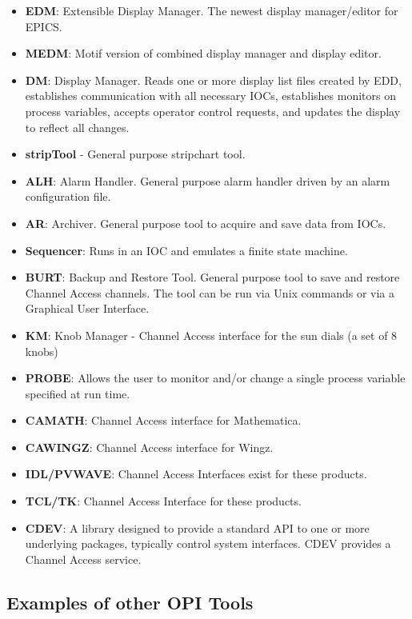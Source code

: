 \begin{itemize}
\item \textbf{EDM}: Extensible Display Manager. The newest display manager/editor for EPICS.

\item \textbf{MEDM}: Motif version of combined display manager and display editor.

\item \textbf{DM}:  Display Manager. Reads one or more display list files created by EDD, establishes communication with all 
necessary IOCs, establishes monitors on process variables, accepts operator control requests, and updates the 
display to reflect all changes.

\item \textbf{stripTool} - General purpose stripchart tool.

\item \textbf{ALH}: Alarm Handler. General purpose alarm handler driven by an alarm configuration file.

\item \textbf{AR}:  Archiver. General purpose tool to acquire and save data from IOCs.

\item \textbf{Sequencer}:  Runs in an IOC and emulates a finite state machine.

\item \textbf{BURT}:  Backup and Restore Tool. General purpose tool to save and restore Channel Access channels. The tool can 
be run via Unix commands or via a Graphical User Interface.

\item \textbf{KM}:  Knob Manager - Channel Access interface for the sun dials (a set of 8 knobs)

\item \textbf{PROBE}: Allows the user to monitor and/or change a single process variable specified at run time.

\item \textbf{CAMATH}:  Channel Access interface for Mathematica.

\item \textbf{CAWINGZ}:  Channel Access interface for Wingz.

\item \textbf{IDL/PVWAVE}: Channel Access Interfaces exist for these products.

\item \textbf{TCL/TK}: Channel Access Interface for these products.

\item \textbf{CDEV}: A library designed to provide a standard API to one or more underlying packages, typically control 
system interfaces. CDEV provides a Channel Access service.

\end{itemize}\subsection{Examples of other OPI Tools}

